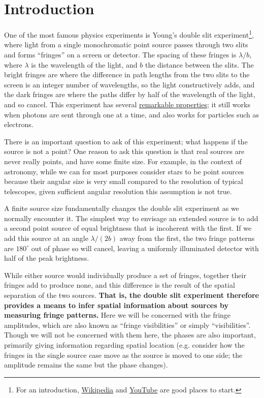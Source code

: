 \documentclass[11pt]{article}
\begin{document}
\section{Introduction}

One of the most famous physics experiments is Young's double slit experiment\footnote{For an introduction, \href{https://en.wikipedia.org/wiki/Double-slit_experiment}{Wikipedia} and \href{https://www.youtube.com/watch?v=A9tKncAdlHQ}{YouTube} are good places to start.}, where light from a single monochromatic point source passes through two slits and forms ``fringes'' on a screen or detector. The spacing of these fringes is $\lambda/b$, where $\lambda$ is the wavelength of the light, and $b$ the distance between the slits. The bright fringes are where the difference in path lengths from the two slits to the screen is an integer number of wavelengths, so the light constructively adds, and the dark fringes are where the paths differ by half of the wavelength of the light, and so cancel. This experiment has several \href{https://en.wikipedia.org/wiki/Double-slit_experiment}{remarkable properties}; it still works when photons are sent through one at a time, and also works for particles such as electrons.

There is an important question to ask of this experiment; what happens if the source is not a point? One reason to ask this question is that real sources are never really points, and have some finite size. For example, in the context of astronomy, while we can for most purposes consider stars to be point sources because their angular size is very small compared to the resolution of typical telescopes, given sufficient angular resolution this assumption is not true.

A finite source size fundamentally changes the double slit experiment as we normally encounter it. The simplest way to envisage an extended source is to add a second point source of equal brightness that is incoherent with the first. If we add this source at an angle $\lambda/(2b)$ away from the first, the two fringe patterns are $180^\circ$ out of phase so will cancel, leaving a uniformly illuminated detector with half of the peak brightness.

\clearpage

While either source would individually produce a set of fringes, together their fringes add to produce none, and this difference is the result of the spatial separation of the two sources. \textbf{That is, the double slit experiment therefore provides a means to infer spatial information about sources by measuring fringe patterns.} Here we will be concerned with the fringe amplitudes, which are also known as ``fringe visibilities'' or simply ``visibilities''. Though we will not be concerned with them here, the phases are also important, primarily giving information regarding spatial location (e.g. consider how the fringes in the single source case move as the source is moved to one side; the amplitude remains the same but the phase changes).
\end{document}
